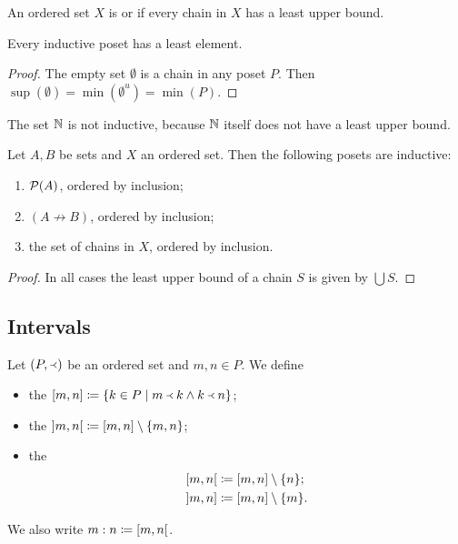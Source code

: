 \begin{definition}
An ordered set $X$ is  or  if every chain in $X$ has a least upper bound.
\end{definition}

\begin{lemma}
Every inductive poset has a least element.
\end{lemma}
\begin{proof}
The empty set $\emptyset$ is a chain in any poset $P$. Then $\sup(\emptyset) = \min(\emptyset^u) = \min(P)$.
\end{proof}

\begin{example}
The set $\mathbb{N}$ is not inductive, because $\mathbb{N}$ itself does not have a least upper bound.
\end{example}

\begin{proposition} \label{inductive}
Let $A,B$ be sets and $X$ an ordered set. Then the following posets are inductive:
\begin{enumerate}
\item $\operatorname{\mathcal{P}}(A)$, ordered by inclusion;
\item $(A \not\to B)$, ordered by inclusion;
\item the set of chains in $X$, ordered by inclusion.
\end{enumerate}
\end{proposition}
\begin{proof}
In all cases the least upper bound of a chain $S$ is given by $\bigcup S$.
\end{proof}

\subsection{Intervals}
\begin{definition}
Let $(P,\Yleft)$ be an ordered set and $m,n\in P$. We define
\begin{itemize}
\item the  $\interval[c]{m,n} \defeq \setbuilder{k\in P}{m\Yleft k \land k\Yleft n}$;
\item the  $\interval[o]{m,n} \defeq [m,n]\setminus\{m,n\}$;
\item the 
\begin{align*}
\interval[co]{m,n} &\defeq \interval{m,n}\setminus\{n\}; \\
\interval[oc]{m,n} &\defeq \interval{m,n}\setminus\{m\}.
\end{align*}
\end{itemize}
We also write $m:n \defeq \interval[co]{m,n}$.
\end{definition}


